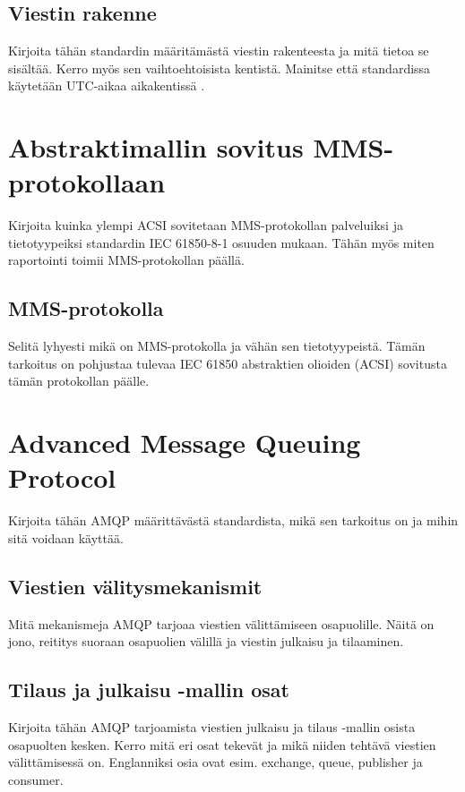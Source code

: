 \subsection{Viestin rakenne}
\begin{it}
	Kirjoita tähän standardin määritämästä viestin rakenteesta ja mitä tietoa se sisältää. Kerro myös sen vaihtoehtoisista kentistä.
	Mainitse että standardissa käytetään UTC-aikaa aikakentissä \cite[s.~50]{IEC61850-7-1}.
\end{it}


\section{Abstraktimallin sovitus MMS-protokollaan}
\begin{it}
	Kirjoita kuinka ylempi ACSI sovitetaan MMS-protokollan palveluiksi ja tietotyypeiksi standardin IEC 61850-8-1 osuuden mukaan. Tähän myös miten raportointi toimii MMS-protokollan päällä.
\end{it}


\subsection{MMS-protokolla}
\begin{it}
	Selitä lyhyesti mikä on MMS-protokolla ja vähän sen tietotyypeistä. Tämän tarkoitus on pohjustaa tulevaa IEC 61850 abstraktien olioiden (ACSI) sovitusta tämän protokollan päälle.
\end{it}


\section{Advanced Message Queuing Protocol}
\begin{it}
	Kirjoita tähän AMQP määrittävästä standardista, mikä sen tarkoitus on ja mihin sitä voidaan käyttää.
\end{it}


\subsection{Viestien välitysmekanismit}
\begin{it}
	Mitä mekanismeja AMQP tarjoaa viestien välittämiseen osapuolille. Näitä on jono, reititys suoraan osapuolien välillä ja viestin julkaisu ja tilaaminen.
\end{it}


\subsection{Tilaus ja julkaisu -mallin osat}
\begin{it}
	Kirjoita tähän AMQP tarjoamista viestien julkaisu ja tilaus -mallin osista osapuolten kesken. Kerro mitä eri osat tekevät ja mikä niiden tehtävä viestien välittämisessä on. Englanniksi osia ovat esim. exchange, queue, publisher ja consumer.
\end{it}